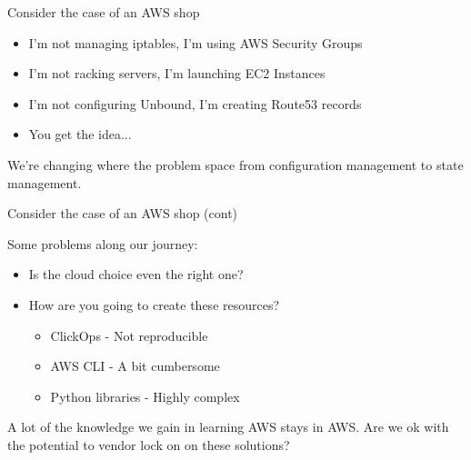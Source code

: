 \documentclass{beamer}
\begin{document}

\begin{frame}{Consider the case of an AWS shop}

\begin{itemize}
    \item I'm not managing iptables, I'm using AWS Security Groups
    \item I'm not racking servers, I'm launching EC2 Instances
    \item I'm not configuring Unbound, I'm creating Route53 records
    \item You get the idea... 
\end{itemize}

\vspace{0.3cm}
We're changing where the problem space from configuration management to state management.

\end{frame}


\begin{frame}{Consider the case of an AWS shop (cont)}

Some problems along our journey:
\vspace{0.3cm}

\begin{itemize}
    \item Is the cloud choice even the right one?
    \item How are you going to create these resources?
    \begin{itemize}
        \item ClickOps - Not reproducible
        \item AWS CLI - A bit cumbersome
        \item Python libraries - Highly complex
    \end{itemize}
\end{itemize}

\vspace{0.3cm}
A lot of the knowledge we gain in learning AWS stays in AWS. Are we ok with the potential to vendor lock on on these solutions?

\end{frame}

\end{document}
